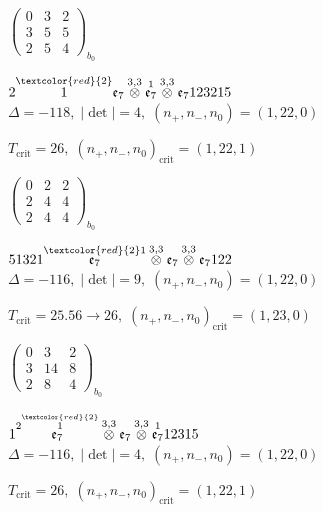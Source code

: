 \documentclass[10pt]{article}
\begin{document}
\hspace{2em}$\left(\begin{smallmatrix}0 & 3 & 2 \\ 3 & 5 & 5 \\ 2 & 5 & 4\end{smallmatrix}\right)_{\!b_0}$

$2\overset{\textcolor{red}{2}}{1}\mathfrak{e}_7\overset{3,3}{\otimes}\overset{1}{\mathfrak{e}_7}\overset{3,3}{\otimes}\mathfrak{e}_7123215$ \quad $\Delta=-118,\; |\det|=4,\; (n_+,n_-,n_0)=(1,22,0)$

\hspace{1em}$T_{\text{crit}}=26,\; (n_+,n_-,n_0)_{\text{crit}}=(1,22,1)$

\hspace{2em}$\left(\begin{smallmatrix}0 & 2 & 2 \\ 2 & 4 & 4 \\ 2 & 4 & 4\end{smallmatrix}\right)_{\!b_0}$

\smallskip

$51321\overset{\textcolor{red}{2}1}{\mathfrak{e}_7}\overset{3,3}{\otimes}\mathfrak{e}_7\overset{3,3}{\otimes}\mathfrak{e}_7122$ \quad $\Delta=-116,\; |\det|=9,\; (n_+,n_-,n_0)=(1,22,0)$

\hspace{1em}$T_{\text{crit}}=25.56 \to 26,\; (n_+,n_-,n_0)_{\text{crit}}=(1,23,0)$

\hspace{2em}$\left(\begin{smallmatrix}0 & 3 & 2 \\ 3 & 14 & 8 \\ 2 & 8 & 4\end{smallmatrix}\right)_{\!b_0}$

\smallskip

$1\overset{2\overset{\textcolor{red}{2}}{1}}{\mathfrak{e}_7}\overset{3,3}{\otimes}\mathfrak{e}_7\overset{3,3}{\otimes}\overset{1}{\mathfrak{e}_7}12315$ \quad $\Delta=-116,\; |\det|=4,\; (n_+,n_-,n_0)=(1,22,0)$

\hspace{1em}$T_{\text{crit}}=26,\; (n_+,n_-,n_0)_{\text{crit}}=(1,22,1)$
\end{document}
